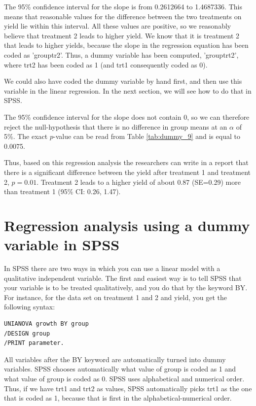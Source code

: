 \documentclass[]{report}\usepackage[]{graphicx}\usepackage[]{color}
\begin{document}
The 95\% confidence interval for the slope is from 0.2612664 to 1.4687336. This means that reasonable values for the difference between the two treatments on yield lie within this interval. All these values are positive, so we reasonably believe that treatment 2 leads to higher yield. We know that it is treatment 2 that leads to higher yields, because the slope in the regression equation has been coded as 'grouptr2'. Thus, a dummy variable has been computed, 'grouptrt2', where trt2 has been coded as 1 (and trt1 consequently coded as 0). 

We could also have coded the dummy variable by hand first, and then use this variable in the linear regression. In the next section, we will see how to do that in SPSS.

The 95\% confidence interval for the slope does not contain 0, so we can therefore reject the null-hypothesis that there is no difference in group means at an $\alpha$ of 5\%. The exact $p$-value can be read from Table \ref{tab:dummy_9} and is equal to 0.0075.

Thus, based on this regression analysis the researchers can write in a report that there is a significant difference between the yield after treatment 1 and treatment 2, $p=0.01$. Treatment 2 leads to a higher yield of about 0.87 (SE=0.29) more than treatment 1 (95\% CI: 0.26, 1.47).

\section{Regression analysis using a dummy variable in SPSS}

In SPSS there are two ways in which you can use a linear model with a qualitative independent variable. The first and easiest way is to tell SPSS that your variable is to be treated qualitatively, and you do that by the keyword BY. For instance, for the data set on treatment 1 and 2 and yield, you get the following syntax:

\begin{verbatim}
UNIANOVA growth BY group 
/DESIGN group
/PRINT parameter.
\end{verbatim}

All variables after the BY keyword are automatically turned into dummy variables. SPSS chooses automatically what value of group is coded as 1 and what value of group is coded as 0. SPSS uses alphabetical and numerical order. Thus, if we have trt1 and trt2 as values, SPSS automatically picks trt1 as the one that is coded as 1, because that is first in the alphabetical-numerical order. 
\end{document}
